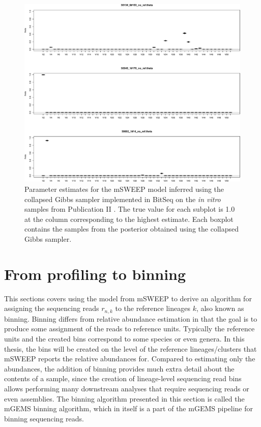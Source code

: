 \documentclass[officiallayout]{tktla}
\begin{document}
\begin{figure}[!t]
    \centering
    \includegraphics[width=\textwidth,keepaspectratio]{img/gibbs/gibbs_reals.pdf}
    \caption{Parameter estimates for the mSWEEP model inferred using
      the collapsed Gibbs sampler implemented in BitSeq
      \citep{glaus2012identifying} on the \textit{in vitro} samples
      from Publication II \citep{maklin_bacterial_2021}. The true
      value for each subplot is 1.0 at the column corresponding to the
      highest estimate. Each boxplot contains the samples from the
      posterior obtained using the collapsed Gibbs sampler.}
    \label{fig:gibbs-estimates}
\end{figure}

\section{From profiling to binning}
\label{section:binning}

This sections covers using the model from mSWEEP to derive an
algorithm for assigning the sequencing reads $r_{n, k}$ to the
reference lineages $k$, also known as binning. Binning differs from
relative abundance estimation in that the goal is to produce some
assignment of the reads to reference units. Typically the reference
units and the created bins correspond to some species or even
genera. In this thesis, the bins will be created on the level of the
reference lineages/clusters that mSWEEP reports the relative
abundances for. Compared to estimating only the abundances, the
addition of binning provides much extra detail about the contents of a
sample, since the creation of lineage-level sequencing read bins
allows performing many downstream analyses that require sequencing
reads or even assemblies. The binning algorithm presented in this
section is called the mGEMS binning algorithm, which in itself is a
part of the mGEMS pipeline for binning sequencing reads.
\end{document}
